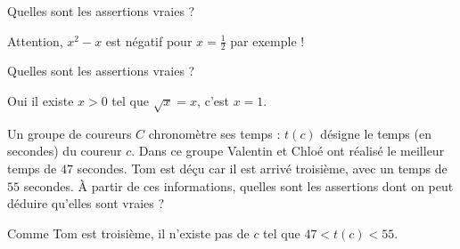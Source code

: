 \begin{question}

Quelles sont les assertions vraies ?
\begin{answers}    



\end{answers}
\begin{explanations}
Attention, $x^2-x$ est négatif pour $x=\frac12$ par exemple !
\end{explanations}
\end{question}


\begin{question}

Quelles sont les assertions vraies ?
\begin{answers}  


 
\end{answers}
\begin{explanations}
Oui il existe $x>0$ tel que $\sqrt{x} = x$, c'est $x=1$.
\end{explanations}
\end{question}


\begin{question}

Un groupe de coureurs $C$ chronomètre ses temps : $t(c)$ désigne le temps (en secondes) du coureur $c$.
Dans ce groupe Valentin et Chloé ont réalisé le meilleur temps de $47$ secondes. Tom est déçu car il est arrivé troisième, avec un temps de $55$ secondes.
À partir de ces informations, quelles sont les assertions dont on peut déduire qu'elles sont vraies ?
\begin{answers}



\end{answers}
\begin{explanations}
Comme Tom est troisième, il n'existe pas de $c$ tel que $47 < t(c) < 55$. 
\end{explanations}
\end{question}


